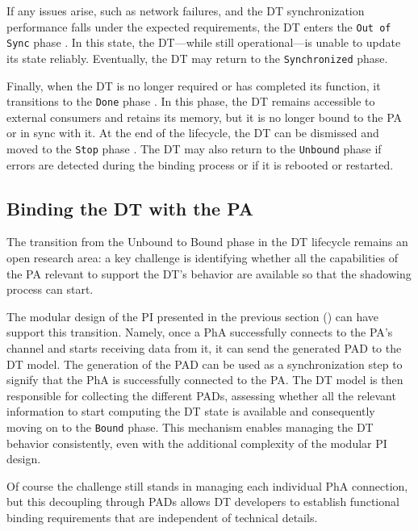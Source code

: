 If any issues arise, such as network failures, and the \ac{DT} synchronization performance falls under the expected requirements, the \ac{DT} enters the \texttt{Out of Sync} phase .
In this state, the \ac{DT}---while still operational---is unable to update its state reliably. 
%
Eventually, the \ac{DT} may return to the \texttt{Synchronized} phase.

Finally, when the \ac{DT} is no longer required or has completed its function, it transitions to the \texttt{Done} phase .
In this phase, the \ac{DT} remains accessible to external consumers and retains its memory, but it is no longer bound to the \ac{PA} or in sync with it. At the end of the lifecycle, the \ac{DT} can be dismissed and moved to the \texttt{Stop} phase .
The \ac{DT} may also return to the \texttt{Unbound} phase if errors are detected during the binding process or if it is rebooted or restarted.


\subsection{Binding the DT with the PA}

The transition from the Unbound to Bound phase in the \ac{DT} lifecycle remains an open research area:
a key challenge is identifying whether all the capabilities of the \ac{PA} relevant to support the \ac{DT}'s behavior are available so that the shadowing process can start.

The modular design of the \ac{PI} presented in the previous section () can have support this transition.
%
Namely, once a \ac{PhA} successfully connects to the \ac{PA}'s channel and starts receiving data from it, it can send the generated \ac{PAD} to the \ac{DT} model.
The generation of the \ac{PAD} can be used as a synchronization step to signify that the \ac{PhA} is successfully connected to the \ac{PA}.
%
The \ac{DT} model is then responsible for collecting the different \acp{PAD}, assessing whether all the relevant information to start computing the \ac{DT} state is available and consequently moving on to the \texttt{Bound} phase.
%
This mechanism enables managing the \ac{DT} behavior consistently, even with the additional complexity of the modular \ac{PI} design.

Of course the challenge still stands in managing each individual \ac{PhA} connection, but this decoupling through \acp{PAD} allows \ac{DT} developers to establish functional binding requirements that are independent of technical details. 

